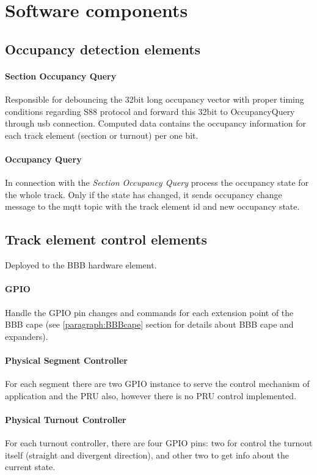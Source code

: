 \section{Software components}
\subsection{Occupancy detection elements} \label{section:OccupancyDetection}
\paragraph{Section Occupancy Query}
Responsible for debouncing the 32bit long occupancy vector with proper timing conditions regarding S88 protocol and forward this 32bit to OccupancyQuery through usb connection. Computed data contains the occupancy information for each track element (section or turnout) per one bit.
\paragraph{Occupancy Query}
In connection with the \textit{Section Occupancy Query} process the occupancy state for the whole track. Only if the state has changed, it sends occupancy change message to the mqtt topic with the track element id and new occupancy state.

\subsection{Track element control elements}
Deployed to the BBB hardware element.
\paragraph{GPIO}
Handle the GPIO pin changes and commands for each extension point of the BBB cape (see \ref{paragraph:BBBcape} section for details about BBB cape and expanders).
\paragraph{Physical Segment Controller}
For each segment there are two GPIO instance to serve the control mechanism of application and the PRU also, however there is no PRU control implemented.
\paragraph{Physical Turnout Controller}
For each turnout controller, there are four GPIO pins: two for control the turnout itself (straight and divergent direction), and other two to get info about the current state.
